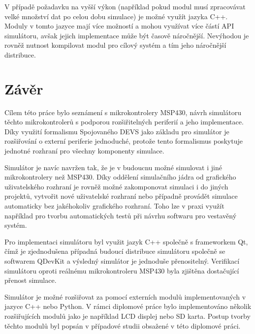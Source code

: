 V případě požadavku na vyšší výkon (například pokud modul musí zpracovávat velké množství dat po celou dobu simulace) je možné využít jazyka C++. Moduly v tomto jazyce mají více možností a mohou využívat více částí API simulátoru, avšak jejich implementace může být časově náročnější. Nevýhodou je rovněž nutnost kompilovat modul pro cílový systém a tím jeho náročnější distribuce.


\chapter{Závěr}

Cílem této práce bylo seznámení s mikrokontrolery MSP430, návrh simulátoru těchto mikrokontrolerů s podporou rozšiřitelných periferií a jeho implementace. Díky využití formalismu Spojovaného DEVS jako základu pro simulátor je rozšiřování o externí periferie jednoduché, protože tento formalismus poskytuje jednotné rozhraní pro všechny komponenty simulace.

Simulátor je navíc navržen tak, že je v budoucnu možné simulovat i jiné mikrokontrolery než MSP430. Díky oddělení simulačního jádra od grafického uživatelského rozhraní je rovněž možné zakomponovat simulaci i do jiných projektů, vytvořit nové uživatelské rozhraní nebo případně provádět simulace automaticky bez jakéhokoliv grafického rozhraní. Toho lze v praxi využít například pro tvorbu automatických testů při návrhu softwaru pro vestavěný systém.

Pro implementaci simulátoru byl využit jazyk C++ společně s frameworkem Qt, čímž je zjednodušena případná budoucí distribuce simulátoru společně se softwarem QDevKit a výsledný simulátor je jednoduše přenositelný. Verifikací simulátoru oproti reálnému mikrokontroleru MSP430 byla zjištěna dostačující přenost simulace.

Simulátor je možné rozšiřovat za pomocí externích modulů implementovaných v jazyce C++ nebo Python. V rámci diplomové práce bylo implementováno několik rozšiřujících modulů jako je například LCD displej nebo SD karta. Postup tvorby těchto modulů byl popsán v případové studii obsažené v této diplomové práci.





